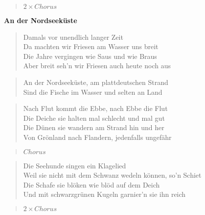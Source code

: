 \documentclass[9pt,a4paper,oneside, onecolumn]{article}
\begin{document}
\begin{small}
\begin{verse}
$2\times Chorus$
\end{verse}
\textbf{An der Nordseeküste}

\begin{verse}
Damals vor unendlich langer Zeit\\
Da machten wir Friesen am Wasser uns breit\\
Die Jahre vergingen wie Saus und wie Braus\\
Aber breit seh'n wir Friesen auch heute noch aus\\
\end{verse}

\begin{verse}
An der Nordseeküste, am plattdeutschen Strand\\
Sind die Fische im Wasser und selten an Land\\
\end{verse}

\begin{verse}
Nach Flut kommt die Ebbe, nach Ebbe die Flut\\
Die Deiche sie halten mal schlecht und mal gut\\
Die Dünen sie wandern am Strand hin und her\\
Von Grönland nach Flandern, jedenfalls ungefähr\\
\end{verse}

\begin{verse}
$Chorus$
\end{verse}

\begin{verse}
Die Seehunde singen ein Klagelied\\
Weil sie nicht mit dem Schwanz wedeln können, so'n Schiet\\
Die Schafe sie blöken wie blöd auf dem Deich\\
Und mit schwarzgrünen Kugeln garnier'n sie ihn reich\\
\end{verse}

\begin{verse}
$2\times Chorus$
\end{verse}

\end{small}
\end{document}
